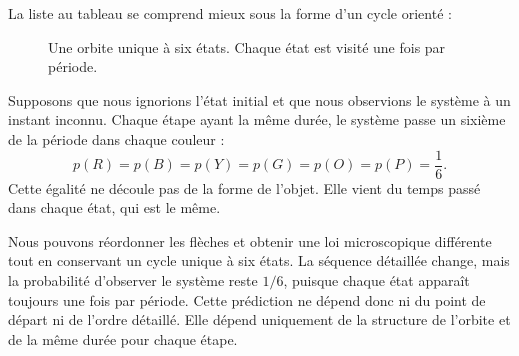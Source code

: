 La liste au tableau se comprend mieux sous la forme d’un cycle orienté :
\begin{figure}[htbp]
\centering
{}
Une orbite unique à six états. Chaque état est visité une fois par période.\caption{
}
\label{fig:sm1-six-cycle}
\end{figure}

Supposons que nous ignorions l’état initial et que nous observions le système à un instant inconnu. Chaque étape ayant la même durée, le système passe un sixième de la période dans chaque couleur :
\begin{equation}
 p(R)=p(B)=p(Y)=p(G)=p(O)=p(P)=\frac16.
 \label{eq:sm1-uniform-cycle}
\end{equation}
Cette égalité ne découle pas de la forme de l’objet. Elle vient du temps passé dans chaque état, qui est le même.

Nous pouvons réordonner les flèches et obtenir une loi microscopique différente tout en conservant un cycle unique à six états. La séquence détaillée change, mais la probabilité d’observer le système reste \(1/6\), puisque chaque état apparaît toujours une fois par période. Cette prédiction ne dépend donc ni du point de départ ni de l’ordre détaillé. Elle dépend uniquement de la structure de l’orbite et de la même durée pour chaque étape.

\begin{classroomqa}
\end{classroomqa}

